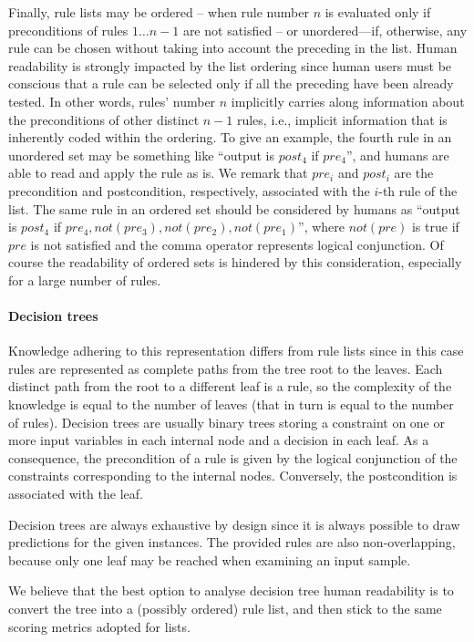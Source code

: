 \documentclass[sigconf]{acmart}
\begin{document}
Finally, rule lists may be ordered -- when rule number $n$ is evaluated only if preconditions of rules $1 \dots n-1$ are not satisfied -- or unordered---if, otherwise, any rule can be chosen without taking into account the preceding in the list.
%
Human readability is strongly impacted by the list ordering since human users must be conscious that a rule can be selected only if all the preceding have been already tested.
%
In other words, rules' number $n$ implicitly carries along information about the preconditions of other distinct $n-1$ rules, i.e., implicit information that is inherently coded within the ordering.
%
To give an example, the fourth rule in an unordered set may be something like ``output is $post_4$ if $pre_4$'', and humans are able to read and apply the rule as is.
%
We remark that $pre_i$ and $post_i$ are the precondition and postcondition, respectively, associated with the $i$-th rule of the list.
%
The same rule in an ordered set should be considered by humans as ``output is $post_4$ if $pre_4, not(pre_3), not(pre_2), not(pre_1)$'', where $not(pre)$ is true if $pre$ is not satisfied and the comma operator represents logical conjunction.
%
Of course the readability of ordered sets is hindered by this consideration, especially for a large number of rules.

\paragraph{Decision trees}

Knowledge adhering to this representation differs from rule lists since in this case rules are represented as complete paths from the tree root to the leaves.
%
Each distinct path from the root to a different leaf is a rule, so the complexity of the knowledge is equal to the number of leaves (that in turn is equal to the number of rules).
%
Decision trees are usually binary trees storing a constraint on one or more input variables in each internal node and a decision in each leaf.
%
As a consequence, the precondition of a rule is given by the logical conjunction of the constraints corresponding to the internal nodes.
%
Conversely, the postcondition is associated with the leaf.

Decision trees are always exhaustive by design since it is always possible to draw predictions for the given instances.
%
The provided rules are also non-overlapping, because only one leaf may be reached when examining an input sample.

We believe that the best option to analyse decision tree human readability is to convert the tree into a (possibly ordered) rule list, and then stick to the same scoring metrics adopted for lists.
\end{document}
